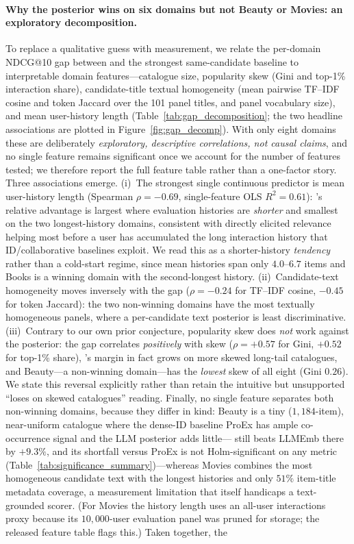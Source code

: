 \paragraph{Why the posterior wins on six domains but not Beauty or Movies: an exploratory decomposition.} To replace a qualitative guess with measurement, we relate the per-domain NDCG@10 gap between \method{} and the strongest same-candidate baseline to interpretable domain features---catalogue size, popularity skew (Gini and top-1\% interaction share), candidate-title textual homogeneity (mean pairwise TF--IDF cosine and token Jaccard over the 101 panel titles, and panel vocabulary size), and mean user-history length (Table~\ref{tab:gap_decomposition}; the two headline associations are plotted in Figure~\ref{fig:gap_decomp}). With only eight domains these are deliberately \emph{exploratory, descriptive correlations, not causal claims}, and no single feature remains significant once we account for the number of features tested; we therefore report the full feature table rather than a one-factor story. Three associations emerge. (i)~The strongest single continuous predictor is mean user-history length (Spearman $\rho=-0.69$, single-feature OLS $R^2=0.61$): \method{}'s relative advantage is largest where evaluation histories are \emph{shorter} and smallest on the two longest-history domains, consistent with directly elicited relevance helping most before a user has accumulated the long interaction history that ID/collaborative baselines exploit. We read this as a shorter-history \emph{tendency} rather than a cold-start regime, since mean histories span only $4.0$--$6.7$ items and Books is a winning domain with the second-longest history. (ii)~Candidate-text homogeneity moves inversely with the gap ($\rho=-0.24$ for TF--IDF cosine, $-0.45$ for token Jaccard): the two non-winning domains have the most textually homogeneous panels, where a per-candidate text posterior is least discriminative. (iii)~Contrary to our own prior conjecture, popularity skew does \emph{not} work against the posterior: the gap correlates \emph{positively} with skew ($\rho=+0.57$ for Gini, $+0.52$ for top-1\% share), \method{}'s margin in fact grows on more skewed long-tail catalogues, and Beauty---a non-winning domain---has the \emph{lowest} skew of all eight (Gini $0.26$). We state this reversal explicitly rather than retain the intuitive but unsupported ``loses on skewed catalogues'' reading. Finally, no single feature separates both non-winning domains, because they differ in kind: Beauty is a tiny ($1{,}184$-item), near-uniform catalogue where the dense-ID baseline ProEx has ample co-occurrence signal and the LLM posterior adds little---\method{} still beats LLMEmb there by $+9.3\%$, and its shortfall versus ProEx is not Holm-significant on any metric (Table~\ref{tab:significance_summary})---whereas Movies combines the most homogeneous candidate text with the longest histories and only $51\%$ item-title metadata coverage, a measurement limitation that itself handicaps a text-grounded scorer. (For Movies the history length uses an all-user interactions proxy because its $10{,}000$-user evaluation panel was pruned for storage; the released feature table flags this.) Taken together, the 